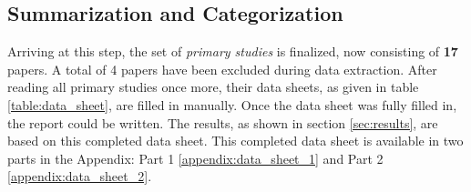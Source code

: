 \subsection{Summarization and Categorization}
\label{sec:study_design:summ_categor}
Arriving at this step, the set of \textit{primary studies} is finalized, now consisting of \textbf{17} papers. 
A total of 4 papers have been excluded during data extraction.
After reading all primary studies once more, their data sheets, as given in table \ref{table:data_sheet}, are filled in manually. 
Once the data sheet was fully filled in, the report could be written. 
The results, as shown in section \ref{sec:results}, are based on this completed data sheet.
This completed data sheet is available in two parts in the Appendix: Part 1 \ref{appendix:data_sheet_1} and Part 2 \ref{appendix:data_sheet_2}.